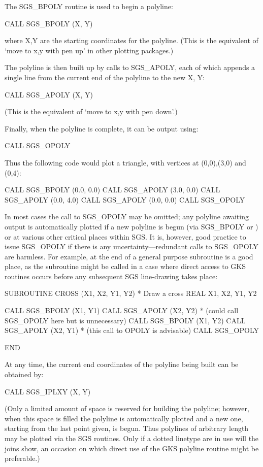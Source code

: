 \documentclass[11pt]{starlink}
\begin{document}
The SGS\_BPOLY
routine is used to begin a polyline:
\begin{terminalv}
CALL SGS_BPOLY (X, Y)
\end{terminalv}
where X,Y are the starting coordinates for the polyline.  (This
is the equivalent of `move to x,y with pen up' in other
plotting packages.)

The polyline
is then built up by calls to SGS\_APOLY, each of which appends
a single line from the current end of the polyline
to the new X, Y:
\begin{terminalv}
CALL SGS_APOLY (X, Y)
\end{terminalv}
(This is the equivalent of `move to x,y with pen down'.)

Finally, when the polyline is complete, it can be
output using:
\begin{terminalv}
CALL SGS_OPOLY
\end{terminalv}
Thus the following code
would plot a triangle, with vertices
at (0,0),(3,0) and (0,4):
\begin{terminalv}
CALL SGS_BPOLY (0.0, 0.0)
CALL SGS_APOLY (3.0, 0.0)
CALL SGS_APOLY (0.0, 4.0)
CALL SGS_APOLY (0.0, 0.0)
CALL SGS_OPOLY
\end{terminalv}
In most cases the call to SGS\_OPOLY may be omitted;  any polyline
awaiting output is automatically plotted if a
new polyline is begun (via SGS\_BPOLY or
) or at
various other critical places within SGS.
It is, however, good practice to issue SGS\_OPOLY if there is
any uncertainty---redundant calls to
SGS\_OPOLY are harmless.  For example, at the end of a general purpose
subroutine is a good
place, as the subroutine might be called in a case where
direct access to GKS routines occurs before any
subsequent SGS line-drawing takes place:
\begin{terminalv}
     SUBROUTINE CROSS (X1, X2, Y1, Y2)
*  Draw a cross
     REAL X1, X2, Y1, Y2

     CALL SGS_BPOLY (X1, Y1)
     CALL SGS_APOLY (X2, Y2)
*  (could call SGS_OPOLY here but is unnecessary)
     CALL SGS_BPOLY (X1, Y2)
     CALL SGS_APOLY (X2, Y1)
*  (this call to OPOLY is advisable)
     CALL SGS_OPOLY

     END
\end{terminalv}

At any time, the current end coordinates of the polyline being
built can be obtained by:
\begin{terminalv}
CALL SGS_IPLXY (X, Y)
\end{terminalv}
(Only a limited amount of space is reserved for building the
polyline;  however, when this space is filled the polyline is
automatically plotted and a new one, starting from the
last point given, is begun.  Thus polylines of arbitrary length may
be plotted via the SGS routines.  Only if a dotted linetype
are in use will the joins show, an occasion on
which direct use of the GKS polyline routine might be
preferable.)
\end{document}
